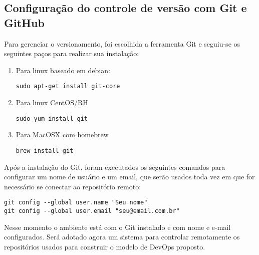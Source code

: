 \subsection{Configuração do controle de versão com Git e GitHub}
Para gerenciar o versionamento, foi escolhida a ferramenta Git e 
seguiu-se os seguintes paços para realizar sua instalação:

  \begin{enumerate}
   \item Para linux baseado em debian:
      \begin{lstlisting}
sudo apt-get install git-core
      \end{lstlisting}
      
   \item Para linux CentOS/RH
      \begin{lstlisting}
sudo yum install git
      \end{lstlisting}
   
   \item Para MacOSX com homebrew
      \begin{lstlisting}
brew install git
      \end{lstlisting}
 \end{enumerate}
Após a instalação do Git, foram executados os seguintes 
comandos para configurar um nome de usuário e um email, 
que serão usados toda vez em que for necessário se 
conectar ao repositório remoto: 
      \begin{lstlisting}
git config --global user.name "Seu nome"
git config --global user.email "seu@email.com.br"
      \end{lstlisting}
Nesse momento o ambiente está com o Git instalado 
e com nome e e-mail configurados. Será adotado 
agora um sistema para controlar remotamente os repositórios 
usados para construir o modelo de DevOps proposto.

